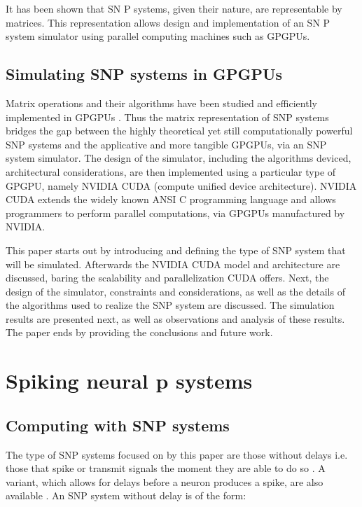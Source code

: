 \documentclass{acm_proc_article-sp}
\begin{document}
It has been shown that SN P systems, given their nature, are representable by matrices\cite{snpbrain}\cite{snpmat}. This representation allows design and implementation of an SN P system simulator using parallel computing machines such as GPGPUs. 

\pagebreak

\subsection{Simulating SNP systems in GPGPUs}
Matrix operations and their algorithms have been studied and efficiently implemented in GPGPUs \cite{matrixgpu1}\cite{matrixgpu2}. Thus the matrix representation of SNP systems bridges the gap between the highly theoretical yet still computationally powerful SNP systems and the applicative and more tangible GPGPUs, via an SNP system simulator. The design of the simulator, including the algorithms deviced, architectural considerations, are then implemented using a particular type of GPGPU, namely NVIDIA CUDA (compute unified device architecture). NVIDIA CUDA extends the widely known ANSI C programming language and allows programmers to perform parallel computations, via GPGPUs manufactured by NVIDIA.

This paper starts out by introducing and defining the type of SNP system that will be simulated. Afterwards the NVIDIA CUDA model and architecture are discussed, baring the scalability and parallelization CUDA offers. Next, the design of the simulator, constraints and considerations, as well as the details of the algorithms used to realize the SNP system are discussed. The simulation results are presented next, as well as observations and analysis of these results. The paper ends by providing the conclusions and future work.




\section{Spiking neural p systems}

\subsection{Computing with SNP systems}
The type of SNP systems focused on by this paper are those without delays i.e. those that spike or transmit signals the moment they are able to do so \cite{snpbrain}\cite{snpmat}. A variant, which allows for delays before a neuron produces a spike, are also available \cite{snp}. An SNP system without delay is of the form:
\end{document}
